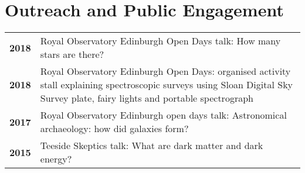 \documentclass[a4paper,fleqn,usenatbib,onecolumn]{mnras}
\begin{document}
\section*{Outreach and Public Engagement}
\begingroup
\setlength{\tabcolsep}{0pt} %
\renewcommand{\arraystretch}{1.4} %
\begin{longtable}{ p{2cm} p{15cm} }

\bf{2018} & Royal Observatory Edinburgh Open Days talk: How many stars are there?\\

\bf{2018} & Royal Observatory Edinburgh Open Days: organised activity stall explaining spectroscopic surveys using Sloan Digital Sky Survey plate, fairy lights and portable spectrograph\\

\bf{2017} & Royal Observatory Edinburgh open days talk: Astronomical archaeology: how did galaxies form?\\

\bf{2015} & Teeside Skeptics talk: What are dark matter and dark energy?\\

\end{longtable}
\endgroup
\end{document}
